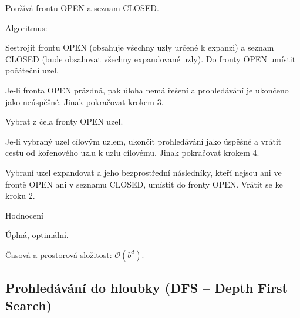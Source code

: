\begin{compactitem}
    \item Používá frontu OPEN a seznam CLOSED.

    \item Algoritmus: \begin{compactenum}
        \item Sestrojit frontu OPEN (obsahuje všechny uzly určené k expanzi) a seznam CLOSED (bude obsahovat všechny expandované uzly). Do fronty OPEN umístit počáteční uzel.

        \item Je-li fronta OPEN prázdná, pak úloha nemá řešení a prohledávání je ukončeno jako neúspěšné. Jinak pokračovat krokem 3.

        \item Vybrat z čela fronty OPEN uzel.

        \item Je-li vybraný uzel cílovým uzlem, ukončit prohledávání jako úspěšné a vrátit cestu od kořenového uzlu k uzlu cílovému. Jinak pokračovat krokem 4.

        \item Vybraní uzel expandovat a jeho bezprostřední následníky, kteří nejsou ani ve frontě OPEN ani v seznamu CLOSED, umístit do fronty OPEN. Vrátit se ke kroku 2.
    \end{compactenum}

    \item Hodnocení \begin{compactitem}
        \item Úplná, optimální.
        \item Časová a prostorová složitost: $\mathcal{O}(b^d)$.
    \end{compactitem}
\end{compactitem}

\subsection{Prohledávání do hloubky (DFS -- Depth First Search)}


